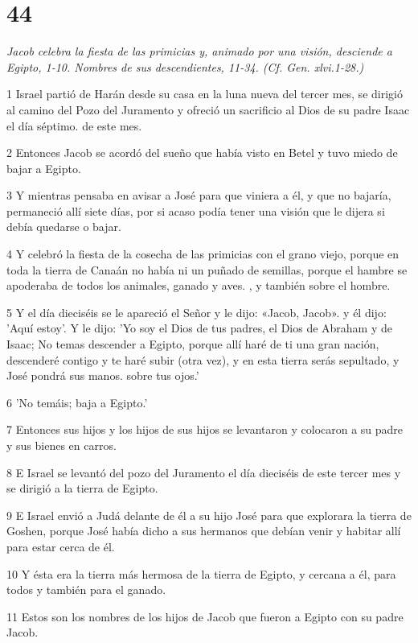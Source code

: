 \chapter{44}

\par \textit{Jacob celebra la fiesta de las primicias y, animado por una visión, desciende a Egipto, 1-10. Nombres de sus descendientes, 11-34. (Cf. Gen. xlvi.1-28.)}

\par 1 Israel partió de Harán desde su casa en la luna nueva del tercer mes, se dirigió al camino del Pozo del Juramento y ofreció un sacrificio al Dios de su padre Isaac el día séptimo. de este mes.
\par 2 Entonces Jacob se acordó del sueño que había visto en Betel y tuvo miedo de bajar a Egipto.
\par 3 Y mientras pensaba en avisar a José para que viniera a él, y que no bajaría, permaneció allí siete días, por si acaso podía tener una visión que le dijera si debía quedarse o bajar.
\par 4 Y celebró la fiesta de la cosecha de las primicias con el grano viejo, porque en toda la tierra de Canaán no había ni un puñado de semillas, porque el hambre se apoderaba de todos los animales, ganado y aves. , y también sobre el hombre.
\par 5 Y el día dieciséis se le apareció el Señor y le dijo: «Jacob, Jacob». y él dijo: 'Aquí estoy'. Y le dijo: 'Yo soy el Dios de tus padres, el Dios de Abraham y de Isaac; No temas descender a Egipto, porque allí haré de ti una gran nación, descenderé contigo y te haré subir (otra vez), y en esta tierra serás sepultado, y José pondrá sus manos. sobre tus ojos.'
\par 6 'No temáis; baja a Egipto.'
\par 7 Entonces sus hijos y los hijos de sus hijos se levantaron y colocaron a su padre y sus bienes en carros.
\par 8 E Israel se levantó del pozo del Juramento el día dieciséis de este tercer mes y se dirigió a la tierra de Egipto.
\par 9 E Israel envió a Judá delante de él a su hijo José para que explorara la tierra de Goshen, porque José había dicho a sus hermanos que debían venir y habitar allí para estar cerca de él.
\par 10 Y ésta era la tierra más hermosa de la tierra de Egipto, y cercana a él, para todos y también para el ganado.
\par 11 Estos son los nombres de los hijos de Jacob que fueron a Egipto con su padre Jacob.
